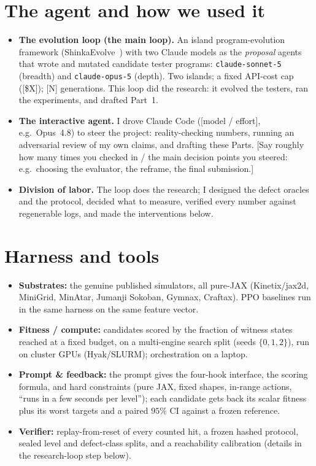 \documentclass[11pt]{article}
\begin{document}
\section{The agent and how we used it}
\label{sec:agent}
\begin{itemize}\itemsep2pt
  \item \textbf{The evolution loop (the main loop).} An island program-evolution framework (ShinkaEvolve~\citep{shinkaevolve})
  with two Claude models as the \emph{proposal} agents that wrote and mutated candidate tester programs:
  \texttt{claude-sonnet-5} (breadth) and \texttt{claude-opus-5} (depth). Two islands; a fixed API-cost cap ([\$X]); [N]
  generations. This loop did the research: it evolved the testers, ran the experiments, and drafted Part~1.
  \item \textbf{The interactive agent.} I drove Claude Code ([model / effort], e.g.\ Opus~4.8) to steer the project:
  reality-checking numbers, running an adversarial review of my own claims, and drafting these Parts. [Say roughly how
  many times you checked in / the main decision points you steered: e.g.\ choosing the evaluator, the reframe, the final
  submission.]
  \item \textbf{Division of labor.} The loop does the research; I designed the defect oracles and the protocol, decided
  what to measure, verified every number against regenerable logs, and made the interventions below.
\end{itemize}

\section{Harness and tools}
\label{sec:harness}
\begin{itemize}\itemsep2pt
  \item \textbf{Substrates:} the genuine published simulators, all pure-JAX (Kinetix/jax2d, MiniGrid, MinAtar, Jumanji
  Sokoban, Gymnax, Craftax). PPO baselines run in the same harness on the same feature vector.
  \item \textbf{Fitness / compute:} candidates scored by the fraction of witness states reached at a fixed budget, on a
  multi-engine search split (seeds $\{0,1,2\}$), run on cluster GPUs (Hyak/SLURM); orchestration on a laptop.
  \item \textbf{Prompt \& feedback:} the prompt gives the four-hook interface, the scoring formula, and hard constraints
  (pure JAX, fixed shapes, in-range actions, ``runs in a few seconds per level''); each candidate gets back its scalar
  fitness plus its worst targets and a paired $95\%$ CI against a frozen reference.
  \item \textbf{Verifier:} replay-from-reset of every counted hit, a frozen hashed protocol, sealed level and defect-class
  splits, and a reachability calibration (details in the research-loop step below).
\end{itemize}
\end{document}
